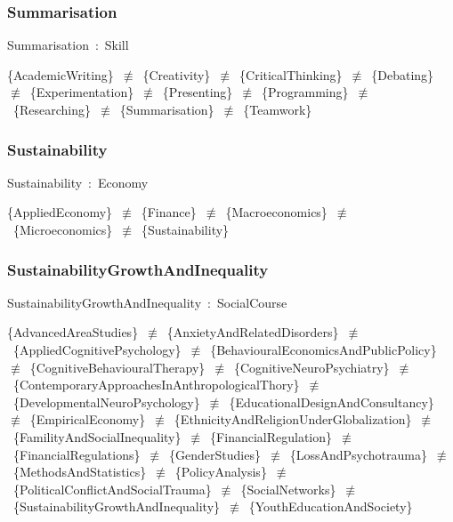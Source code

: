 \documentclass{article}
\begin{document}
\subsubsection*{Summarisation}

Summarisation~:~Skill

\{AcademicWriting\}~\ensuremath{\not\equiv}~\{Creativity\}~\ensuremath{\not\equiv}~\{CriticalThinking\}~\ensuremath{\not\equiv}~\{Debating\}~\ensuremath{\not\equiv}~\{Experimentation\}~\ensuremath{\not\equiv}~\{Presenting\}~\ensuremath{\not\equiv}~\{Programming\}~\ensuremath{\not\equiv}~\{Researching\}~\ensuremath{\not\equiv}~\{Summarisation\}~\ensuremath{\not\equiv}~\{Teamwork\}

\subsubsection*{Sustainability}

Sustainability~:~Economy

\{AppliedEconomy\}~\ensuremath{\not\equiv}~\{Finance\}~\ensuremath{\not\equiv}~\{Macroeconomics\}~\ensuremath{\not\equiv}~\{Microeconomics\}~\ensuremath{\not\equiv}~\{Sustainability\}

\subsubsection*{SustainabilityGrowthAndInequality}

SustainabilityGrowthAndInequality~:~SocialCourse

\{AdvancedAreaStudies\}~\ensuremath{\not\equiv}~\{AnxietyAndRelatedDisorders\}~\ensuremath{\not\equiv}~\{AppliedCognitivePsychology\}~\ensuremath{\not\equiv}~\{BehaviouralEconomicsAndPublicPolicy\}~\ensuremath{\not\equiv}~\{CognitiveBehaviouralTherapy\}~\ensuremath{\not\equiv}~\{CognitiveNeuroPsychiatry\}~\ensuremath{\not\equiv}~\{ContemporaryApproachesInAnthropologicalThory\}~\ensuremath{\not\equiv}~\{DevelopmentalNeuroPsychology\}~\ensuremath{\not\equiv}~\{EducationalDesignAndConsultancy\}~\ensuremath{\not\equiv}~\{EmpiricalEconomy\}~\ensuremath{\not\equiv}~\{EthnicityAndReligionUnderGlobalization\}~\ensuremath{\not\equiv}~\{FamilityAndSocialInequality\}~\ensuremath{\not\equiv}~\{FinancialRegulation\}~\ensuremath{\not\equiv}~\{FinancialRegulations\}~\ensuremath{\not\equiv}~\{GenderStudies\}~\ensuremath{\not\equiv}~\{LossAndPsychotrauma\}~\ensuremath{\not\equiv}~\{MethodsAndStatistics\}~\ensuremath{\not\equiv}~\{PolicyAnalysis\}~\ensuremath{\not\equiv}~\{PoliticalConflictAndSocialTrauma\}~\ensuremath{\not\equiv}~\{SocialNetworks\}~\ensuremath{\not\equiv}~\{SustainabilityGrowthAndInequality\}~\ensuremath{\not\equiv}~\{YouthEducationAndSociety\}
\end{document}
